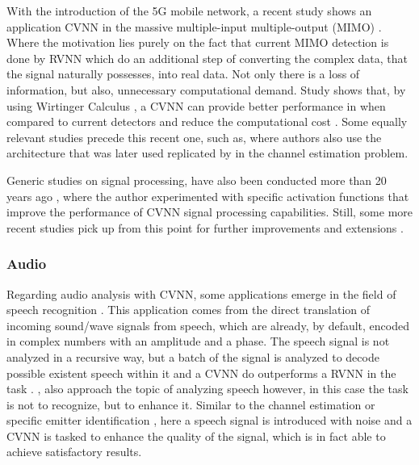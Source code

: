 With the introduction of the 5G mobile network, a recent study shows an application \gls{CVNN} in the massive multiple-input multiple-output (MIMO) \parencite{tiba2023signalmimocvnn} . Where the motivation lies purely on the fact that current MIMO detection is done by \gls{RVNN} which do an additional step of converting the complex data, that the signal naturally possesses, into real data. Not only there is a loss of information, but also, unnecessary computational demand. Study shows that, by using Wirtinger Calculus \parencite{brandwood1983complex}, a \gls{CVNN} can provide better performance in when compared to current detectors and reduce the computational cost \parencite{tiba2023signalmimocvnn}. Some equally relevant studies precede this recent one, such as, \parencite{marseet2017firstmimo} where authors also use the architecture that was later used replicated by \parencite{yuan2019channel} in the channel estimation problem.

Generic studies on signal processing, have also been conducted more than 20 years ago \parencite{kim2000envelope, kim2002perceptron}, where the author experimented with specific activation functions that improve the performance of \gls{CVNN} signal processing capabilities. Still, some more recent studies pick up from this point for further improvements and extensions \parencite{scardapane2018complex}.

\subsubsection{Audio}
Regarding audio analysis with \gls{CVNN}, some applications emerge in the field of speech recognition \parencite{hayakawa2018speech}. This application comes from the direct translation of incoming sound/wave signals from speech, which are already, by default, encoded in complex numbers with an amplitude and a phase. The speech signal is not analyzed in a recursive way, but a batch of the signal is analyzed to decode possible existent speech within it and a \gls{CVNN} do outperforms a \gls{RVNN} in the task \parencite{hayakawa2018speech}. \textcite{hu2020dccrn}, also approach the topic of analyzing speech however, in this case the task is not to recognize, but to enhance it. Similar to the channel estimation or specific emitter identification \parencite{wang2021emmiteridcvnn}, here a speech signal is introduced with noise and a \gls{CVNN} is tasked to enhance the quality of the signal, which is in fact able to achieve satisfactory results.

